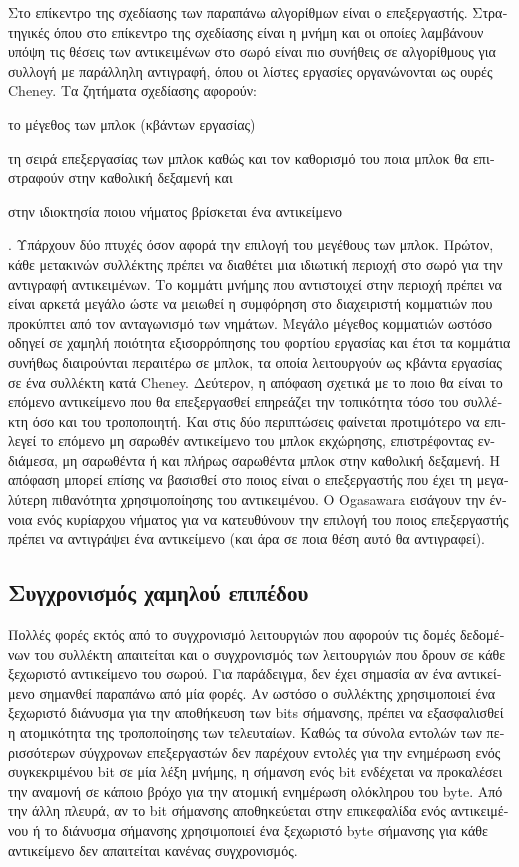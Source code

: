 \begin{greek}
Στο επίκεντρο της σχεδίασης των παραπάνω αλγορίθμων είναι ο
επεξεργαστής. Στρατηγικές όπου στο επίκεντρο της σχεδίασης
είναι η μνήμη και οι οποίες λαμβάνουν υπόψη τις θέσεις των
αντικειμένων στο σωρό είναι πιο συνήθεις σε αλγορίθμους για
συλλογή με παράλληλη αντιγραφή, όπου οι λίστες εργασίες
οργανώνονται ως ουρές Cheney. Τα ζητήματα σχεδίασης αφορούν:
\begin{inparaenum}[(i)]
\item το μέγεθος των μπλοκ (κβάντων εργασίας)
\item τη σειρά επεξεργασίας των μπλοκ καθώς και τον καθορισμό
      του ποια μπλοκ θα επιστραφούν στην καθολική δεξαμενή και
\item στην ιδιοκτησία ποιου νήματος βρίσκεται ένα αντικείμενο
\end{inparaenum}. 
Υπάρχουν δύο πτυχές όσον αφορά την επιλογή του μεγέθους των
μπλοκ. Πρώτον, κάθε μετακινών συλλέκτης πρέπει να διαθέτει
μια ιδιωτική περιοχή στο σωρό για την αντιγραφή αντικειμένων.
Το κομμάτι μνήμης που αντιστοιχεί στην περιοχή πρέπει να είναι
αρκετά μεγάλο ώστε να μειωθεί η συμφόρηση στο διαχειριστή
κομματιών που προκύπτει από τον ανταγωνισμό των νημάτων. Μεγάλο
μέγεθος κομματιών ωστόσο οδηγεί σε χαμηλή ποιότητα εξισορρόπησης
του φορτίου εργασίας και έτσι τα κομμάτια συνήθως διαιρούνται
περαιτέρω σε μπλοκ, τα οποία λειτουργούν ως κβάντα εργασίας
σε ένα συλλέκτη κατά Cheney. Δεύτερον, η απόφαση σχετικά με
το ποιο θα είναι το επόμενο αντικείμενο που θα επεξεργασθεί
επηρεάζει την τοπικότητα τόσο του συλλέκτη όσο και του τροποποιητή.
Και στις δύο περιπτώσεις φαίνεται προτιμότερο να επιλεγεί
το επόμενο μη σαρωθέν αντικείμενο του μπλοκ εκχώρησης, επιστρέφοντας
ενδιάμεσα, μη σαρωθέντα ή και πλήρως σαρωθέντα μπλοκ στην
καθολική δεξαμενή. Η απόφαση μπορεί επίσης να βασισθεί στο
ποιος είναι ο επεξεργαστής που έχει τη μεγαλύτερη πιθανότητα
χρησιμοποίησης του αντικειμένου. Ο Ogasawara \cite{DBLP:conf/oopsla/Ogasawara09}
εισάγουν την έννοια ενός κυρίαρχου νήματος για να κατευθύνουν
την επιλογή του ποιος επεξεργαστής πρέπει να αντιγράψει ένα
αντικείμενο (και άρα σε ποια θέση αυτό θα αντιγραφεί).

\subsection{Συγχρονισμός χαμηλού επιπέδου}
Πολλές φορές εκτός από το συγχρονισμό λειτουργιών που αφορούν
τις δομές δεδομένων του συλλέκτη απαιτείται και ο συγχρονισμός
των λειτουργιών που δρουν σε κάθε ξεχωριστό αντικείμενο του
σωρού. Για παράδειγμα, δεν έχει σημασία αν ένα αντικείμενο
σημανθεί παραπάνω από μία φορές. Αν ωστόσο ο συλλέκτης χρησιμοποιεί
ένα ξεχωριστό διάνυσμα για την αποθήκευση των bits σήμανσης,
πρέπει να εξασφαλισθεί η ατομικότητα της τροποποίησης των
τελευταίων. Καθώς τα σύνολα εντολών των περισσότερων σύγχρονων
επεξεργαστών δεν παρέχουν εντολές για την ενημέρωση ενός συγκεκριμένου
bit σε μία λέξη μνήμης, η σήμανση ενός bit ενδέχεται να προκαλέσει
την αναμονή σε κάποιο βρόχο για την ατομική ενημέρωση ολόκληρου
του byte. Από την άλλη πλευρά, αν το bit σήμανσης αποθηκεύεται
στην επικεφαλίδα ενός αντικειμένου ή το διάνυσμα σήμανσης
χρησιμοποιεί ένα ξεχωριστό byte σήμανσης για κάθε αντικείμενο
δεν απαιτείται κανένας συγχρονισμός.


\end{greek}
